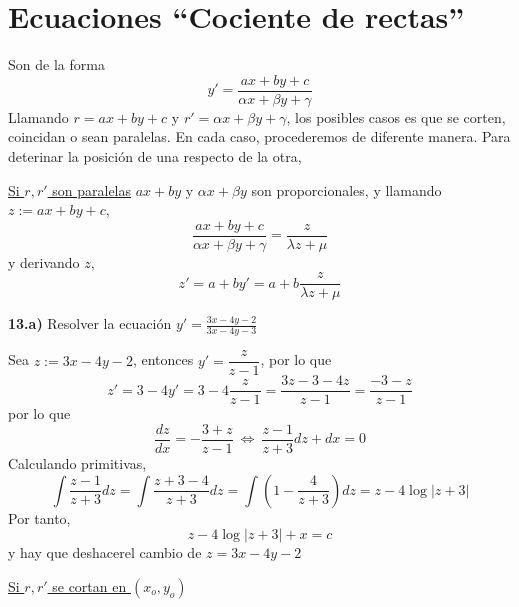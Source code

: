 \section{Ecuaciones ``Cociente de rectas''}
Son de la forma
$$y'=\dfrac{ax+by+c}{\alpha x+\beta y +\gamma}$$
Llamando $r=ax+by+c$ y $r'=\alpha x+\beta y +\gamma$, los posibles casos es que se corten, coincidan o sean paralelas. En cada caso, procederemos de diferente manera. Para deterinar la posición de una respecto de la otra, 

\underline{Si $r,r'$ son paralelas} $ax+by$ y $\alpha x+\beta y$ son proporcionales, y llamando $z:=ax+by+c$, 
$$\dfrac{ax+by+c}{\alpha x+\beta y +\gamma}=\dfrac{z}{\lambda z+\mu}$$
y derivando $z$, 
$$z'=a+by'=a+b\dfrac{z}{\lambda z + \mu}$$
\begin{ejer}
    \textbf{13.a)} Resolver la ecuación $y'=\frac{3x-4y-2}{3x-4y-3}$
\end{ejer}
\begin{sol}
    Sea $z:=3x-4y-2$, entonces $y'=\dfrac{z}{z-1}$, por lo que 
    $$z'=3-4y'=3-4\dfrac{z}{z-1}=\dfrac{3z-3-4z}{z-1}=\dfrac{-3-z}{z-1}$$
    por lo que 
    $$\dfrac{dz}{dx}=-\dfrac{3+z}{z-1} \: \iff \: \dfrac{z-1}{z+3}dz+dx=0$$
    Calculando primitivas,
    $$\int \dfrac{z-1}{z+3}dz=\int \dfrac{z+3-4}{z+3}dz=\int\left(1-\dfrac{4}{z+3}\right)dz=z-4\log|z+3|$$
    Por tanto, 
    $$z-4\log|z+3|+x=c$$
    y hay que deshacerel cambio de $z=3x-4y-2$
\end{sol}

\underline{Si $r,r'$ se cortan en $(x_o,y_o)$} 


